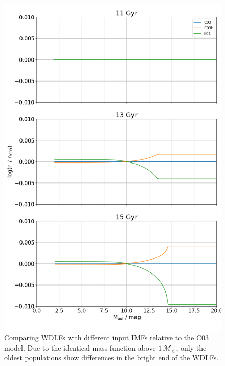 \documentclass[fleqn,usenatbib]{rasti}
\newcommand{\msun}{\mathcal{M}_{\sun}}
\begin{document}
\begin{figure}
    \centering
    \includegraphics[width=0.8\columnwidth]{wdlf_compare_imf.png}
    \caption{Comparing WDLFs with different input IMFs relative to the C03
    model. Due to the identical mass function above $1\,\msun$, only the
    oldest populations show differences in the bright end of the WDLFs.}
    \label{fig:wdlf_compare_imf}
\end{figure}
\end{document}
